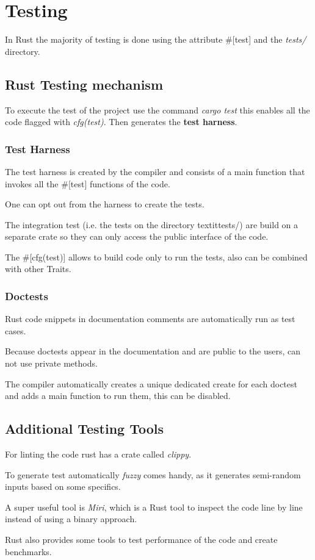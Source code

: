 \section{Testing}

In Rust the majority of testing is done using the attribute \#[test] and the \textit{tests/} directory.

\subsection{Rust Testing mechanism}

To execute the test of the project use the command \textit{cargo test} this enables all the code flagged with \textit{cfg(test)}.
Then generates the \textbf{test harness}.

\subsubsection{Test Harness}

The test harness is created by the compiler and consists of a main function that invokes all the \#[test] functions of the code.

One can opt out from the harness to create the tests.

The integration test (i.e. the tests on the directory textit{tests/}) are build on a separate crate so they can only access the public interface of the code.

The \#[cfg(test)] allows to build code only to run the tests, also can be combined with other Traits.

\subsubsection{Doctests}

Rust code snippets in documentation comments are automatically run as test cases.

Because doctests appear in the documentation and are public to the users, can not use private methods.

The compiler automatically creates a unique dedicated create for each doctest and adds a main function to run them, this can be disabled.

\subsection{Additional Testing Tools}

For linting the code rust has a crate called \textit{clippy}.

To generate test automatically \textit{fuzzy} comes handy, as it generates semi-random inputs based on some specifics.

A super useful tool is \textit{Miri}, which is a Rust tool to inspect the code line by line instead of using a binary approach.

Rust also provides some tools to test performance of the code and create benchmarks.